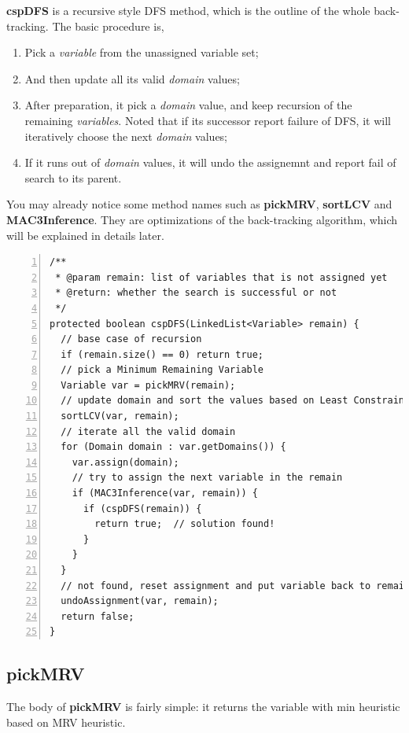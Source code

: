 \documentclass{article}
\begin{document}
\textbf{cspDFS} is a recursive style DFS method, which is the outline of the whole back-tracking. The basic procedure is,

\begin{enumerate}
  \item  Pick a \emph{variable} from the unassigned variable set;
  \item And then update all its valid \emph{domain} values;
  \item After preparation, it pick a \emph{domain} value, and keep recursion of the remaining \emph{variables}. Noted that if its successor report failure of DFS, it will iteratively choose the next \emph{domain} values;
\item   If it runs out of \emph{domain} values, it will undo the assignemnt and report fail of search to its parent.
\end{enumerate}

You may already notice some method names such as \textbf{pickMRV}, \textbf{sortLCV} and \textbf{MAC3Inference}. They are optimizations of the back-tracking algorithm, which will be explained in details later.

\begin{lstlisting}[numbers=left]
/**
 * @param remain: list of variables that is not assigned yet
 * @return: whether the search is successful or not
 */
protected boolean cspDFS(LinkedList<Variable> remain) {
  // base case of recursion
  if (remain.size() == 0) return true;
  // pick a Minimum Remaining Variable
  Variable var = pickMRV(remain);
  // update domain and sort the values based on Least Constraining
  sortLCV(var, remain);
  // iterate all the valid domain
  for (Domain domain : var.getDomains()) {
    var.assign(domain);
    // try to assign the next variable in the remain
    if (MAC3Inference(var, remain)) {
      if (cspDFS(remain)) {
        return true;  // solution found!
      }
    }
  }
  // not found, reset assignment and put variable back to remain
  undoAssignment(var, remain);
  return false;
}
\end{lstlisting}





\clearpage
\subsection{pickMRV}

The body of \textbf{pickMRV} is fairly simple: it returns the variable with min heuristic based on MRV heuristic.
\end{document}
